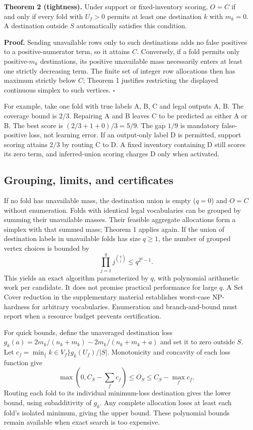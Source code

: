 \documentclass[twocolumn]{svjour3}
\begin{document}
\textbf{Theorem 2 (tightness).} Under support or fixed-inventory scoring, $O=C$ if and only if every fold with $U_f>0$ permits at least one destination $k$ with $m_k=0$. A destination outside $S$ automatically satisfies this condition.

\textbf{Proof.} Sending unavailable rows only to such destinations adds no false positives to a positive-numerator term, so it attains $C$. Conversely, if a fold permits only positive-$m_k$ destinations, its positive unavailable mass necessarily enters at least one strictly decreasing term. The finite set of integer row allocations then has maximum strictly below $C$; Theorem 1 justifies restricting the displayed continuous simplex to such vertices. $\square$

For example, take one fold with true labels A, B, C and legal outputs A, B. The coverage bound is $2/3$. Repairing A and B leaves C to be predicted as either A or B. The best score is $(2/3+1+0)/3=5/9$. The gap $1/9$ is mandatory false-positive loss, not learning error. If an output-only label D is permitted, support scoring attains $2/3$ by routing C to D. A fixed inventory containing D still scores its zero term, and inferred-union scoring charges D only when activated.

\subsection{Grouping, limits, and certificates}
If no fold has unavailable mass, the destination union is empty ($q=0$) and $O=C$ without enumeration.
Folds with identical legal vocabularies can be grouped by summing their unavailable masses. Their feasible aggregate allocations form a simplex with that summed mass; Theorem 1 applies again. If the union of destination labels in unavailable folds has size $q\ge 1$, the number of grouped vertex choices is bounded by
\begin{equation}\prod_{j=1}^q j^{\binom qj}\le q^{2^q-1}.\end{equation}
This yields an exact algorithm parameterized by $q$, with polynomial arithmetic work per candidate. It does not promise practical performance for large $q$. A Set Cover reduction in the supplementary material establishes worst-case NP-hardness for arbitrary vocabularies. Enumeration and branch-and-bound must report when a resource budget prevents certification.

For quick bounds, define the unaveraged destination loss $g_k(a)=2m_k/(n_k+m_k)-2m_k/(n_k+m_k+a)$ and set it to zero outside $S$. Let $c_f=\min_\{k \in V_f\} g_k(U_f)/|S|$. Monotonicity and concavity of each loss function give
\begin{equation}\max(0,C_S-\sum_f c_f)\le O_S\le C_S-\max_f c_f.\end{equation}
Routing each fold to its individual minimum-loss destination gives the lower bound, using subadditivity of $g_k$. Any complete allocation loses at least each fold's isolated minimum, giving the upper bound. These polynomial bounds remain available when exact search is too expensive.
\end{document}
